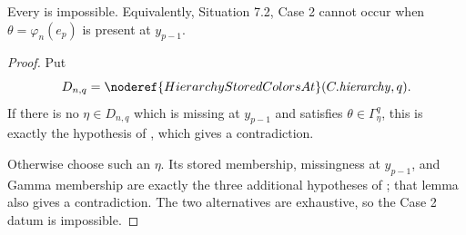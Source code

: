 \begin{lemma}
Every  is impossible.
Equivalently, Situation 7.2, Case 2 cannot occur when
\(\theta=\varphi_n(e_p)\) is present at \(y_{p-1}\).
\end{lemma}
\begin{proof}
Put
\[
 D_{n,q}=\noderef{HierarchyStoredColorsAt}(C.\mathit{hierarchy},q).
\]
If there is no \(\eta\in D_{n,q}\) which is missing at
\(y_{p-1}\) and satisfies \(\theta\in\Gamma^q_\eta\), this is exactly
the hypothesis of
, which gives
a contradiction.

Otherwise choose such an \(\eta\).  Its stored membership, missingness at
\(y_{p-1}\), and Gamma membership are exactly the three additional
hypotheses of
; that lemma
also gives a contradiction.  The two alternatives are exhaustive, so the
Case 2 datum is impossible.
\end{proof}
